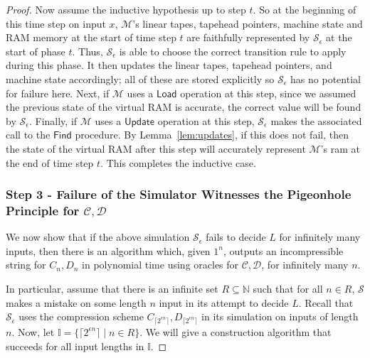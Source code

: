 \documentclass[11pt]{article}
\begin{document}
\begin{proof}
Now assume the inductive hypothesis up to step $t$. So at the beginning of this time step on input $x$, $\mathcal{M}$'s linear tapes, tapehead pointers, machine state and RAM memory at the start of time step $t$ are faithfully represented by $\mathcal{S}_{\epsilon}$ at the start of phase $t$. Thus, $\mathcal{S}_{\epsilon}$ is able to choose the correct transition rule to apply during this phase. It then updates the linear tapes, tapehead pointers, and machine state accordingly; all of these are stored explicitly so $\mathcal{S}_{\epsilon}$ has no potential for failure here. Next, if $\mathcal{M}$ uses a $\mathsf{Load}$ operation at this step, since we assumed the previous state of the virtual RAM is accurate, the correct value will be found by $\mathcal{S}_{\epsilon}$. Finally, if $\mathcal{M}$ uses a $\mathsf{Update}$ operation at this step, $\mathcal{S}_{\epsilon}$ makes the associated call to the $\mathsf{Find}$ procedure. By Lemma~\ref{lem:updates}, if this does not fail, then the state of the virtual RAM after this step will accurately represent $\mathcal{M}$'s ram at the end of time step $t$. This completes the inductive case.

\subsubsection*{Step 3 - Failure of the Simulator Witnesses the Pigeonhole Principle for $\mathcal{C},\mathcal{D}$}

We now show that if the above simulation $\mathcal{S}_{\epsilon}$ fails to decide $L$ for infinitely many inputs, then there is an algorithm which, given $1^n$, outputs an incompressible string for $C_n,D_n$ in polynomial time using oracles for $\mathcal{C},\mathcal{D}$, for infinitely many $n$.

In particular, assume that there is an infinite set $R \subseteq \mathbb{N}$ such that for all $n \in R$, $\mathcal{S}$ makes a mistake on some length $n$ input in its attempt to decide $L$. Recall that $\mathcal{S}_{\epsilon}$ uses the compression scheme $C_{\lceil 2^{\epsilon n} \rceil}, D_{\lceil 2^{\epsilon n} \rceil}$ in its simulation on inputs of length $n$. Now, let $\mathbb{I} = \{\lceil 2^{\epsilon n} \rceil \mid n \in R\}$. We will give a construction algorithm that succeeds for all input lengths in $\mathbb{I}$. 


\end{proof}
\end{document}
